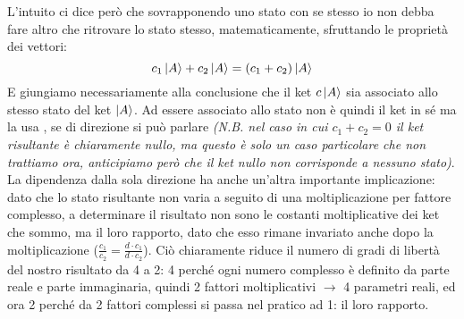 \documentclass[../../../../Meccanica_quantistica]{subfiles}
\begin{document}
  L'intuito ci dice però che sovrapponendo uno stato con se stesso
  io non debba fare altro che ritrovare lo stato stesso,
  matematicamente, sfruttando le proprietà dei vettori:
  \begin{equation*}
    c_1 \ket{A} + c_2 \ket{A} = (c_1 + c_2) \ket{A}
  \end{equation*}
  E giungiamo necessariamente alla conclusione che il ket $c
  \ket{A}$ sia associato allo stesso stato del ket $\ket{A}$.
  Ad essere associato allo stato non è quindi il ket in sé ma la usa
  , se di direzione si può parlare \textit{(N.B. nel
  caso in cui $c_1 + c_2 = 0$ il ket risultante è chiaramente
  nullo, ma questo è solo un caso particolare che non trattiamo ora,
  anticipiamo però che il ket nullo non corrisponde a nessuno
  stato)}. \\
  La dipendenza dalla sola direzione ha anche un'altra importante
  implicazione: dato che lo stato risultante non varia a seguito di
  una moltiplicazione per fattore complesso, a determinare il
  risultato non sono le costanti moltiplicative dei ket che sommo,
  ma il loro rapporto, dato che esso rimane invariato anche dopo la
  moltiplicazione
  ($\frac{c_1}{c_2} = \frac{d \cdot c_1}{d \cdot c_2}$).
  Ciò chiaramente riduce il numero di gradi di libertà del nostro
  risultato da 4 a 2: 4 perché ogni numero complesso è definito da
  parte reale e parte immaginaria, quindi 2 fattori moltiplicativi
  $\to$ 4 parametri reali, ed ora 2 perché da 2 fattori
  complessi si passa nel pratico ad 1: il loro rapporto.
\end{document}
